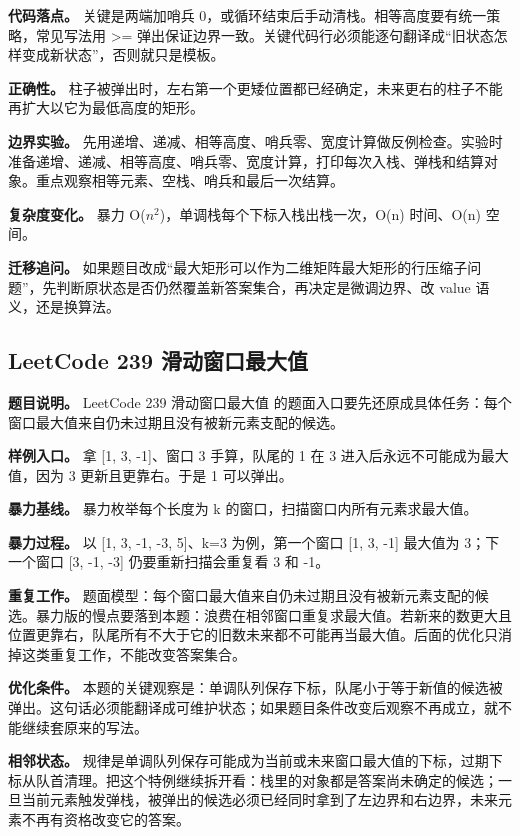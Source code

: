 \textbf{代码落点。} 关键是两端加哨兵 0，或循环结束后手动清栈。相等高度要有统一策略，常见写法用 >= 弹出保证边界一致。关键代码行必须能逐句翻译成“旧状态怎样变成新状态”，否则就只是模板。

\textbf{正确性。} 柱子被弹出时，左右第一个更矮位置都已经确定，未来更右的柱子不能再扩大以它为最低高度的矩形。

\textbf{边界实验。} 先用递增、递减、相等高度、哨兵零、宽度计算做反例检查。实验时准备递增、递减、相等高度、哨兵零、宽度计算，打印每次入栈、弹栈和结算对象。重点观察相等元素、空栈、哨兵和最后一次结算。

\textbf{复杂度变化。} 暴力 O(\ensuremath{n^{2}})，单调栈每个下标入栈出栈一次，O(n) 时间、O(n) 空间。

\textbf{迁移追问。} 如果题目改成“最大矩形可以作为二维矩阵最大矩形的行压缩子问题”，先判断原状态是否仍然覆盖新答案集合，再决定是微调边界、改 value 语义，还是换算法。

\subsection{LeetCode 239 滑动窗口最大值}

\textbf{题目说明。} LeetCode 239 滑动窗口最大值 的题面入口要先还原成具体任务：每个窗口最大值来自仍未过期且没有被新元素支配的候选。

\textbf{样例入口。} 拿 [1, 3, -1]、窗口 3 手算，队尾的 1 在 3 进入后永远不可能成为最大值，因为 3 更新且更靠右。于是 1 可以弹出。

\textbf{暴力基线。} 暴力枚举每个长度为 k 的窗口，扫描窗口内所有元素求最大值。

\textbf{暴力过程。} 以 [1, 3, -1, -3, 5]、k=3 为例，第一个窗口 [1, 3, -1] 最大值为 3；下一个窗口 [3, -1, -3] 仍要重新扫描会重复看 3 和 -1。

\textbf{重复工作。} 题面模型：每个窗口最大值来自仍未过期且没有被新元素支配的候选。暴力版的慢点要落到本题：浪费在相邻窗口重复求最大值。若新来的数更大且位置更靠右，队尾所有不大于它的旧数未来都不可能再当最大值。后面的优化只消掉这类重复工作，不能改变答案集合。

\textbf{优化条件。} 本题的关键观察是：单调队列保存下标，队尾小于等于新值的候选被弹出。这句话必须能翻译成可维护状态；如果题目条件改变后观察不再成立，就不能继续套原来的写法。

\textbf{相邻状态。} 规律是单调队列保存可能成为当前或未来窗口最大值的下标，过期下标从队首清理。把这个特例继续拆开看：栈里的对象都是答案尚未确定的候选；一旦当前元素触发弹栈，被弹出的候选必须已经同时拿到了左边界和右边界，未来元素不再有资格改变它的答案。

